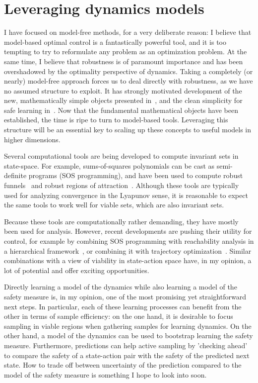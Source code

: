 \section{Leveraging dynamics models} \label{chap:discussion}
I have focused on model-free methods, for a very deliberate reason: I believe that model-based optimal control is a fantastically powerful tool, and it is too tempting to try to reformulate any problem as an optimization problem.
At the same time, I believe that robustness is of paramount importance and has been overshadowed by the optimality perspective of dynamics.
Taking a completely (or nearly) model-free approach forces us to deal directly with robustness, as we have no assumed structure to exploit.
It has strongly motivated development of the new, mathematically simple objects presented in~\cite{heim2019beyond}, and the clean simplicity for safe learning in~\cite{heim2019learnable}.
Now that the fundamental mathematical objects have been established, the time is ripe to turn to model-based tools. Leveraging this structure will be an essential key to scaling up these concepts to useful models in higher dimensions. \par
Several computational tools are being developed to compute invariant sets in state-space. For example, sums-of-squares polynomials can be cast as semi-definite programs (SOS programming), and have been used to compute robust funnels~\cite{majumdar2013robust} and robust regions of attraction~\cite{valmorbida2014roa_invariants}. Although these tools are typically used for analyzing convergence in the Lyapunov sense, it is reasonable to expect the same tools to work well for viable sets, which are also invariant sets. \par
Because these tools are computationally rather demanding, they have mostly been used for analysis. However, recent developments are pushing their utility for control, for example by combining SOS programming with reachability analysis in a hierarchical framework~\cite{singh2018robust}, or combining it with trajectory optimization~\cite{manchester2019robust}. Similar combinations with a view of viability in state-action space have, in my opinion, a lot of potential and offer exciting opportunities. \par
Directly learning a model of the dynamics while also learning a model of the safety measure is, in my opinion, one of the most promising yet straightforward next steps. In particular, each of these learning processes can benefit from the other in terms of sample efficiency: on the one hand, it is desirable to focus sampling in viable regions when gathering samples for learning dynamics. On the other hand, a model of the dynamics can be used to bootstrap learning the safety measure. Furthermore, predictions can help active sampling by 'checking ahead' to compare the safety of a state-action pair with the safety of the predicted next state. How to trade off between uncertainty of the prediction compared to the model of the safety measure is something I hope to look into soon.